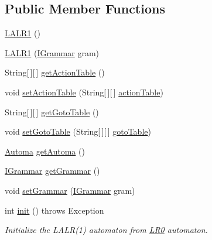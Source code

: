 \subsection*{Public Member Functions}
\begin{DoxyCompactItemize}
\item 
\hyperlink{classcontext_free_1_1parser_1_1_l_a_l_r1_a9b5c281089bfd06c95b3c61504352df2}{L\-A\-L\-R1} ()
\item 
\hyperlink{classcontext_free_1_1parser_1_1_l_a_l_r1_a38a0cedcd893b16f8207455f2287a7ad}{L\-A\-L\-R1} (\hyperlink{interfacecontext_free_1_1grammar_1_1_i_grammar}{I\-Grammar} gram)
\item 
String\mbox{[}$\,$\mbox{]}\mbox{[}$\,$\mbox{]} \hyperlink{classcontext_free_1_1parser_1_1_l_a_l_r1_a4dcd4a4ae0b77edc1dc8abffca59c80a}{get\-Action\-Table} ()
\item 
void \hyperlink{classcontext_free_1_1parser_1_1_l_a_l_r1_a4bf6b83fddf359b6b0f6df26b1e58455}{set\-Action\-Table} (String\mbox{[}$\,$\mbox{]}\mbox{[}$\,$\mbox{]} \hyperlink{classcontext_free_1_1parser_1_1_l_a_l_r1_a50a59810900d20102a28766aad917b79}{action\-Table})
\item 
String\mbox{[}$\,$\mbox{]}\mbox{[}$\,$\mbox{]} \hyperlink{classcontext_free_1_1parser_1_1_l_a_l_r1_af87607068fe2d41d8abbdb49fdeefcc0}{get\-Goto\-Table} ()
\item 
void \hyperlink{classcontext_free_1_1parser_1_1_l_a_l_r1_a002ce309af59de1951007a27d86b53b7}{set\-Goto\-Table} (String\mbox{[}$\,$\mbox{]}\mbox{[}$\,$\mbox{]} \hyperlink{classcontext_free_1_1parser_1_1_l_a_l_r1_a6f27da8ba10ef81be36845b0fffc9858}{goto\-Table})
\item 
\hyperlink{classcontext_free_1_1parser_1_1_automa}{Automa} \hyperlink{classcontext_free_1_1parser_1_1_l_a_l_r1_a27ddf376aef3ff22758c44017b37c63d}{get\-Automa} ()
\item 
\hyperlink{interfacecontext_free_1_1grammar_1_1_i_grammar}{I\-Grammar} \hyperlink{classcontext_free_1_1parser_1_1_l_a_l_r1_ab1127f78e9b15a062f6bf344f1117327}{get\-Grammar} ()
\item 
void \hyperlink{classcontext_free_1_1parser_1_1_l_a_l_r1_a66f5fb1ac9aab089d3fa937acf3f63ce}{set\-Grammar} (\hyperlink{interfacecontext_free_1_1grammar_1_1_i_grammar}{I\-Grammar} gram)
\item 
int \hyperlink{classcontext_free_1_1parser_1_1_l_a_l_r1_a7618cff4af4edfffb9a538a7cb1e79cf}{init} ()  throws Exception
\begin{DoxyCompactList}\small\item\em Initialize the L\-A\-L\-R(1) automaton from \hyperlink{classcontext_free_1_1parser_1_1_l_r0}{L\-R0} automaton. \end{DoxyCompactList}\item 

\end{DoxyCompactItemize}
